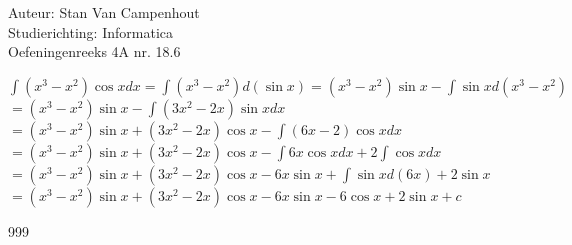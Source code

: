 \documentclass[a4paper]{article}
\begin{document}
  
\noindent \large Auteur: Stan Van Campenhout \\
\noindent \large Studierichting:  Informatica\\
\noindent \large Oefeningenreeks 4A nr. 18.6\\

\medskip

\normalsize

$ \displaystyle\int\left(x^3-x^2\right)\cos xdx =  \displaystyle\int\left(x^3-x^2\right)d\left(\sin x\right)
= \left(x^3-x^2\right)\sin x-\displaystyle\int\sin xd\left(x^3-x^2\right) $\\

$ = \left(x^3-x^2\right)\sin x-\displaystyle\int\left(3x^2-2x\right)\sin xdx $\\

$ = \left(x^3-x^2\right)\sin x + \left(3x^2-2x\right)\cos x - \displaystyle\int\left(6x-2\right)\cos xdx $\\

$ = \left(x^3-x^2\right)\sin x + \left(3x^2-2x\right)\cos x - \displaystyle\int6x\cos xdx + 2\displaystyle\int\cos xdx $\\

$ = \left(x^3-x^2\right)\sin x + \left(3x^2-2x\right)\cos x - 6x\sin x + \displaystyle\int\sin xd\left(6x\right) + 2\sin x $\\

$ = \left(x^3-x^2\right)\sin x + \left(3x^2-2x\right)\cos x - 6x\sin x -6\cos x + 2\sin x + c $\\

\begin{thebibliography}{999}
\end{thebibliography}
\end{document}

